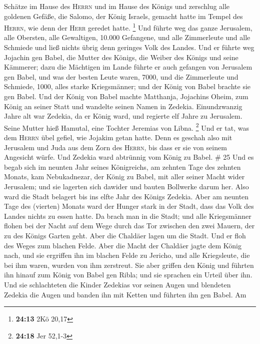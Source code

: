 Schätze im Hause des \textsc{Herrn} und im Hause des Königs und
zerschlug alle goldenen Gefäße, die Salomo, der König Israels, gemacht
hatte im Tempel des \textsc{Herrn}, wie denn der \textsc{Herr} geredet
hatte. \footnote{\textbf{24:13} 2Kö 20,17}  Und führte
weg das ganze Jerusalem, alle Obersten, alle Gewaltigen, 10.000
Gefangene, und alle Zimmerleute und alle Schmiede und ließ nichts übrig
denn geringes Volk des Landes.  Und er führte weg
Jojachin gen Babel, die Mutter des Königs, die Weiber des Königs und
seine Kämmerer; dazu die Mächtigen im Lande führte er auch gefangen von
Jerusalem gen Babel,  und was der besten Leute waren,
7000, und die Zimmerleute und Schmiede, 1000, alles starke Kriegsmänner;
und der König von Babel brachte sie gen Babel.  Und der
König von Babel machte Matthanja, Jojachins Oheim, zum König an seiner
Statt und wandelte seinen Namen in Zedekia. 
Einundzwanzig Jahre alt war Zedekia, da er König ward, und regierte elf
Jahre zu Jerusalem. Seine Mutter hieß Hamutal, eine Tochter Jeremias von
Libna. \footnote{\textbf{24:18} Jer 52,1-3}  Und er tat,
was dem \textsc{Herrn} übel gefiel, wie Jojakim getan hatte.
 Denn es geschah also mit Jerusalem und Juda aus dem Zorn
des \textsc{Herrn}, bis dass er sie von seinem Angesicht würfe. Und
Zedekia ward abtrünnig vom König zu Babel. \# 25  Und es
begab sich im neunten Jahr seines Königreichs, am zehnten Tage des
zehnten Monats, kam Nebukadnezar, der König zu Babel, mit aller seiner
Macht wider Jerusalem; und sie lagerten sich dawider und bauten
Bollwerke darum her.  Also ward die Stadt belagert bis ins
elfte Jahr des Königs Zedekia.  Aber am neunten Tage des
(vierten) Monats ward der Hunger stark in der Stadt, dass das Volk des
Landes nichts zu essen hatte.  Da brach man in die Stadt;
und alle Kriegsmänner flohen bei der Nacht auf dem Wege durch das Tor
zwischen den zwei Mauern, der zu des Königs Garten geht. Aber die
Chaldäer lagen um die Stadt. Und er floh des Weges zum blachen Felde.
 Aber die Macht der Chaldäer jagte dem König nach, und sie
ergriffen ihn im blachen Felde zu Jericho, und alle Kriegsleute, die bei
ihm waren, wurden von ihm zerstreut.  Sie aber griffen den
König und führten ihn hinauf zum König von Babel gen Ribla; und sie
sprachen ein Urteil über ihn.  Und sie schlachteten die
Kinder Zedekias vor seinen Augen und blendeten Zedekia die Augen und
banden ihn mit Ketten und führten ihn gen Babel.  Am
